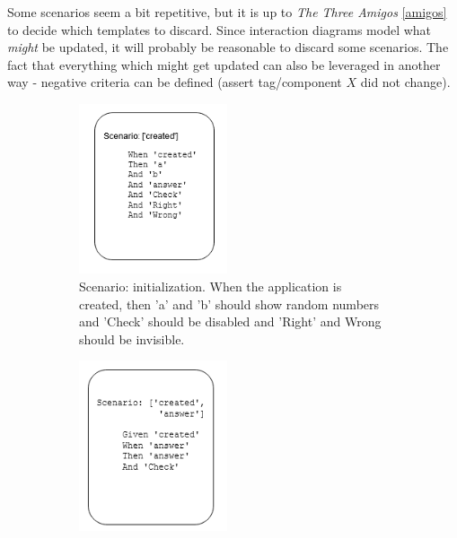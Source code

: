 Some scenarios seem a bit repetitive, but it is up to \textit{The Three Amigos} \ref{amigos} to decide which templates to discard. Since interaction diagrams model what \textit{might} be updated, it will probably be reasonable to discard some scenarios. The fact that everything which might get updated can also be leveraged in another way - negative criteria can be defined (assert tag/component $X$ did not change).
\begin{figure}[H]
    \caption{Gherkin scenarios templates and sample human written scenarios based on the templates }
    \centering
    \begin{subfigure}[b]{0.48\textwidth}
         \centering
         \includegraphics[width=0.48\textwidth]{images/scenarios_1.png}
         \caption{Scenario: initialization. When the application is created, then 'a' and 'b' should show random numbers and 'Check' should be disabled and 'Right' and Wrong should be invisible.}
    \end{subfigure}\hfill%
    \begin{subfigure}[b]{0.48\textwidth}
        \centering
        \includegraphics[width=0.48\textwidth]{images/scenarios_2.png}

\end{subfigure}
\end{figure}
